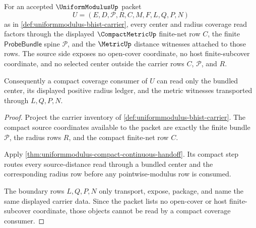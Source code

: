 \begin{theorem}
\label{thm:uniform-modulus-compact-metric-source-lock}
For an accepted $\UniformModulusUp$ packet
$$
U=(E,D,\mathcal{P},R,C,M,F,L,Q,P,N)
$$
as in \autoref{def:uniformmodulus-bhist-carrier}, every center and radius coverage read factors through the displayed $\CompactMetricUp$ finite-net row $C$, the finite $\mathsf{ProbeBundle}$ spine $\mathcal{P}$, and the $\MetricUp$ distance witnesses attached to those rows. The source side exposes no open-cover coordinate, no host finite-subcover coordinate, and no selected center outside the carrier rows $C$, $\mathcal{P}$, and $R$.

Consequently a compact coverage consumer of $U$ can read only the bundled center, its displayed positive radius ledger, and the metric witnesses transported through $L,Q,P,N$.
\end{theorem}
\begin{proof}
Project the carrier inventory of \autoref{def:uniformmodulus-bhist-carrier}. The compact source coordinates available to the packet are exactly the finite bundle $\mathcal{P}$, the radius rows $R$, and the compact finite-net row $C$.

Apply \autoref{thm:uniformmodulus-compact-continuous-handoff}. Its compact step routes every source-distance read through a bundled center and the corresponding radius row before any pointwise-modulus row is consumed.

The boundary rows $L,Q,P,N$ only transport, expose, package, and name the same displayed carrier data. Since the packet lists no open-cover or host finite-subcover coordinate, those objects cannot be read by a compact coverage consumer.
\end{proof}

